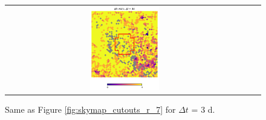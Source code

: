 \documentclass[preprintm,linenumbers]{aastex631}
\begin{document}
\begin{figure}
\begin{tabular}{  c c c}
				\includegraphics[width=0.3\textwidth]{results/skymaps_cutout/skymaps_cutout_delta_first_year_one_snap_v4_0_10yrs_db_noDD_noTwi_tscale-3_nside-256_doAllTemplateMetrics_reduceCount_r_GP_noDD_noTwi.pdf} \\
			\end{tabular}
			\caption{
				 Same as Figure \ref{fig:skymap_cutouts_r_7} for $\Delta t$ = 3 d.  
			}
   \label{fig:skymap_cutouts_r_3}
		\end{figure}
        
\end{document}
